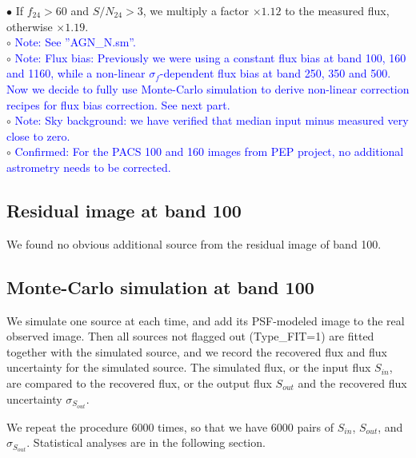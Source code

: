 \documentclass[11pt,a4paper]{article}
\begin{document}
\indent\hspace{15pt}$\bullet$ 
If $f_{24}>60$ and $S/N_{24}>3$, we multiply a factor $\times 1.12$ to the measured flux, otherwise $\times 1.19$. 
\\
\indent\hspace{15pt}$\circ$ 
\textcolor{blue}{Note: See ''AGN\_N.sm''.}
\\
\indent\hspace{15pt}$\circ$ 
\textcolor{blue}{Note: Flux bias: Previously we were using a constant flux bias at band 100, 160 and 1160, while a non-linear $\sigma_{f}$-dependent flux bias at band 250, 350 and 500. Now we decide to fully use Monte-Carlo simulation to derive non-linear correction recipes for flux bias correction. See next part. }
\\
\indent\hspace{15pt}$\circ$ 
\textcolor{blue}{Note: Sky background: we have verified that median input minus measured very close to zero.}
\\
\indent\hspace{15pt}$\circ$ 
\textcolor{blue}{Confirmed: For the PACS 100 and 160 images from PEP project, no additional astrometry needs to be corrected.}
\\

\subsection{Residual image at band 100}
\label{Band100_Galres}

We found no obvious additional source from the residual image of band 100. 

\subsection{Monte-Carlo simulation at band 100}
\label{Band100_Galsim}

We simulate one source at each time, and add its PSF-modeled image to the real observed image. Then all sources not flagged out (Type\_FIT=1) are fitted together with the simulated source, and we record the recovered flux and flux uncertainty for the simulated source. The simulated flux, or the input flux $S_{in}$, are compared to the recovered flux, or the output flux $S_{out}$ and the recovered flux uncertainty $\sigma_{S_{out}}$. 

We repeat the procedure 6000 times, so that we have 6000 pairs of $S_{in}$, $S_{out}$, and $\sigma_{S_{out}}$. Statistical analyses are in the following section. 
\end{document}
